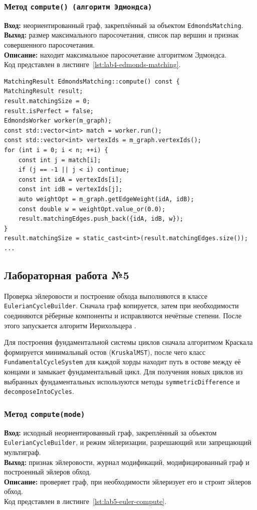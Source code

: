 \documentclass[14pt,a4paper]{extarticle}
\newcommand{\funcblock}[5]{%
\subsubsection*{Метод \code{#1}}
\noindent
\textbf{Вход:} #2\\
\textbf{Выход:} #3\\
\textbf{Описание:} #4\\
Код представлен в листинге~\ref{#5}.%
}
\newcommand{\code}[1]{\texttt{#1}}
\begin{document}
\funcblock
{compute() (алгоритм Эдмондса)}
{неориентированный граф, закреплённый за объектом \code{EdmondsMatching}.}
{размер максимального паросочетания, список пар вершин и признак совершенного паросочетания.}
{находит максимальное паросочетание алгоритмом Эдмондса.}
{lst:lab4-edmonds-matching}
\begin{lstlisting}[style=cppcode,caption={Фрагмент функции \code{compute()} (алгоритм Эдмондса)},label={lst:lab4-edmonds-matching}]
MatchingResult EdmondsMatching::compute() const {
MatchingResult result;
result.matchingSize = 0;
result.isPerfect = false;
EdmondsWorker worker(m_graph);
const std::vector<int> match = worker.run();
const std::vector<int> vertexIds = m_graph.vertexIds();
for (int i = 0; i < n; ++i) {
    const int j = match[i];
    if (j == -1 || j < i) continue;
    const int idA = vertexIds[i];
    const int idB = vertexIds[j];
    auto weightOpt = m_graph.getEdgeWeight(idA, idB);
    const double w = weightOpt.value_or(0.0);
    result.matchingEdges.push_back({idA, idB, w});
}
result.matchingSize = static_cast<int>(result.matchingEdges.size());
...
\end{lstlisting}

\subsection{Лабораторная работа №5}

Проверка эйлеровости и построение обхода выполняются в классе \code{EulerianCycleBuilder}. Сначала граф копируется, затем при необходимости соединяются рёберные компоненты и исправляются нечётные степени. После этого запускается алгоритм Иерихольцера \cite{hierholzer}.

Для построения фундаментальной системы циклов сначала алгоритмом Краскала формируется минимальный остов (\code{KruskalMST}), после чего класс \code{FundamentalCycleSystem} для каждой хорды находит путь в остове между её концами и замыкает фундаментальный цикл. Для получения новых циклов из выбранных фундаментальных используются методы \code{symmetricDifference} и \code{decomposeIntoCycles}.

\funcblock{compute(mode)}{исходный неориентированный граф, закреплённый за объектом \code{EulerianCycleBuilder}, и режим эйлеризации, разрешающий или запрещающий мультиграф.}{признак эйлеровости, журнал модификаций, модифицированный граф и построенный эйлеров обход.}{проверяет граф, при необходимости эйлеризует его и строит эйлеров обход.}{lst:lab5-euler-compute}
\end{document}
